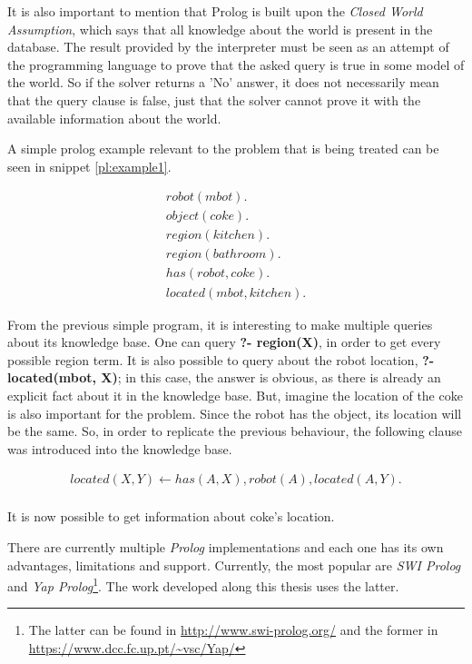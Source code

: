 It is also important to mention that Prolog is built upon the
\textit{Closed World Assumption}, which says that all knowledge about the world
is present in the database. The result provided by the
interpreter must be seen as an attempt of the programming language to prove that
the asked query is true in some model of the world. So if the solver returns a
'No' answer, it does not necessarily mean that the query clause is false, just
that the solver cannot prove it with the available information about the world.

A simple prolog example relevant to the problem that is being treated can be
seen in snippet \ref{pl:example1}.

\begin{gather}
  robot(mbot).\nonumber\\
  object(coke).\nonumber\\
  region(kitchen). \nonumber\\
  region(bathroom). \nonumber\\
  has(robot, coke). \nonumber\\
  located(mbot, kitchen).
  \label{pl:example1}
\end{gather}

From the previous simple program, it is interesting to make multiple queries
about its knowledge base. One can query \textbf{?- region(X)}, in order to get
every possible region term. It is also possible to query about the robot
location, \textbf{?- located(mbot, X)}; in this case, the answer is obvious,
as there is already an explicit fact about it in the knowledge base. But,
imagine the location of the coke is also important for the problem. Since the
robot has the object, its location will be the same. So, in order to replicate
the previous behaviour, the following clause was introduced into the knowledge
base.

\begin{gather}
  located(X, Y) \leftarrow has(A, X), robot(A), located(A,Y).\nonumber\\
  \label{pl:example2}
\end{gather}

It is now possible to get information about coke's location.

There are currently multiple \textit{Prolog} implementations and each one has its
own advantages, limitations and support. Currently, the most popular are
\textit{SWI Prolog} and \textit{Yap Prolog}\footnote{The latter can be found in
\url{http://www.swi-prolog.org/} and the former in
\url{https://www.dcc.fc.up.pt/~vsc/Yap/}}. The work developed along this
thesis uses the latter.


